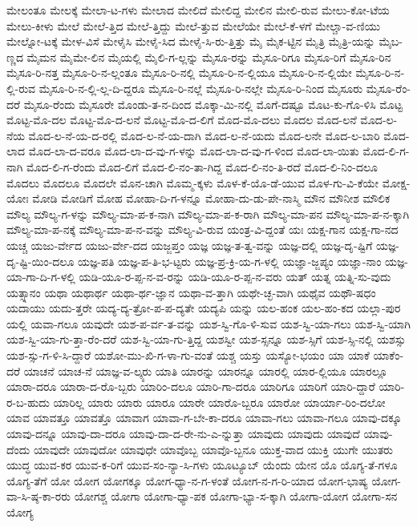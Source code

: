 {ಮೇಲಂತೂ
ಮೇಲಕ್ಕೆ
ಮೇಲಾ-ಟ-ಗಳು
ಮೇಲಾದ
ಮೇಲಿದೆ
ಮೇಲಿದ್ದ
ಮೇಲಿನ
ಮೇಲಿ-ರುವ
ಮೇಲು-ಕೋ-ಟೆಯ
ಮೇಲು-ಕೀಳು
ಮೇಲೆ
ಮೇಲೆ-ತ್ತಿದ
ಮೇಲೆ-ತ್ತಿದ್ದು
ಮೇಲೆ-ತ್ತುವ
ಮೇಲೆಯೇ
ಮೇಲೆ-ಕೆ-ಳಗೆ
ಮೇಲ್ಚಾ-ವ-ಣಿಯು
ಮೇಲ್ನೋ-ಟಕ್ಕೆ
ಮೇಳ-ವಿಸೆ
ಮೇಳೈಸಿ
ಮೇಳೈ-ಸಿದ
ಮೇಳೈ-ಸಿ-ರು-ತ್ತಿತ್ತು
ಮೈ
ಮೈಕ-ಟ್ಟಿನ
ಮೈತ್ರಿ
ಮೈತ್ರಿ-ಯನ್ನು
ಮೈಬ-ಣ್ಣದ
ಮೈಮನ
ಮೈಮೇ-ಲಿನ
ಮೈಯಲ್ಲಿ
ಮೈಲಿ-ಗ-ಲ್ಲನ್ನು
ಮೈಸೂ-ರನ್ನು
ಮೈಸೂ-ರಿಗೂ
ಮೈಸೂ-ರಿಗೆ
ಮೈಸೂ-ರಿನ
ಮೈಸೂ-ರಿ-ನತ್ತ
ಮೈಸೂ-ರಿ-ನ-ಲ್ಲಂತೂ
ಮೈಸೂ-ರಿ-ನಲ್ಲಿ
ಮೈಸೂ-ರಿ-ನ-ಲ್ಲಿಯೂ
ಮೈಸೂ-ರಿ-ನ-ಲ್ಲಿಯೇ
ಮೈಸೂ-ರಿ-ನ-ಲ್ಲಿ-ರುವ
ಮೈಸೂ-ರಿ-ನ-ಲ್ಲಿ-ಲ್ಲ-ದಿ-ದ್ದರೂ
ಮೈಸೂ-ರಿ-ನಲ್ಲೆ
ಮೈಸೂ-ರಿ-ನಲ್ಲೇ
ಮೈಸೂ-ರಿ-ನಿಂದ
ಮೈಸೂರು				
ಮೈಸೂ-ರೆಂ-ದರೆ
ಮೈಸೂ-ರೆಂದು
ಮೈಸೂರೇ
ಮೊಂಡು-ತ-ನ-ದಿಂದ
ಮೊಕ್ಕಾ-ಮಿ-ನಲ್ಲಿ
ಮೊಗೆ-ದಷ್ಟೂ
ಮೊಟ-ಕು-ಗೊ-ಳಿಸಿ
ಮೊಟ್ಟ
ಮೊಟ್ಟ-ಮೊ-ದಲ
ಮೊಟ್ಟ-ಮೊ-ದ-ಲನೆ
ಮೊಟ್ಟ-ಮೊ-ದ-ಲಿಗೆ
ಮೊದ-ಮೊ-ದಲು
ಮೊದಲ
ಮೊದ-ಲನೆ
ಮೊದ-ಲ-ನೆಯ
ಮೊದ-ಲ-ನೆ-ಯ-ದ-ರಲ್ಲಿ
ಮೊದ-ಲ-ನೆ-ಯ-ದಾಗಿ
ಮೊದ-ಲ-ನೆ-ಯದು
ಮೊದ-ಲನೇ
ಮೊದ-ಲ-ಬಾರಿ
ಮೊದ-ಲಾದ
ಮೊದ-ಲಾ-ದ-ವರೂ
ಮೊದ-ಲಾ-ದ-ವು-ಗ-ಳನ್ನು
ಮೊದ-ಲಾ-ದ-ವು-ಗ-ಳಿಂದ
ಮೊದ-ಲಾ-ಯಿತು
ಮೊದ-ಲಿ-ಗ-ನಾಗಿ
ಮೊದ-ಲಿ-ಗ-ರೆಂದು
ಮೊದ-ಲಿಗೆ
ಮೊದ-ಲಿ-ನಂ-ತಾ-ಗಿದ್ದ
ಮೊದ-ಲಿ-ನಂ-ತಿ-ರದೆ
ಮೊದ-ಲಿ-ನಿಂ-ದಲೂ
ಮೊದಲು
ಮೊದಲೂ
ಮೊದಲೇ
ಮೊನ-ಚಾಗಿ
ಮೊಮ್ಮ-ಕ್ಕಳು
ಮೊಳ-ಕೆ-ಯೊ-ಡೆ-ಯುವ
ಮೊಳ-ಗು-ವಿ-ಕೆಯೇ
ಮೋಕ್ಷ-ಯೋಃ
ಮೋಡಿ
ಮೋಡಿಗೆ
ಮೋಹ
ಮೋಹಾ-ದಿ-ಗ-ಳನ್ನೂ
ಮೋಹಾ-ದು-ಡು-ಪೇ-ನಾಸ್ಮಿ
ಮೌನ
ಮೌನೀಶ
ಮೌಲಿಕ
ಮೌಲ್ಯ
ಮೌಲ್ಯ-ಗ-ಳನ್ನು
ಮೌಲ್ಯ-ಮಾ-ಪ-ಕ-ನಾಗಿ
ಮೌಲ್ಯ-ಮಾ-ಪ-ಕ-ರಾಗಿ
ಮೌಲ್ಯ-ಮಾ-ಪನ
ಮೌಲ್ಯ-ಮಾ-ಪ-ನ-ಕ್ಕಾಗಿ
ಮೌಲ್ಯ-ಮಾ-ಪ-ನಕ್ಕೆ
ಮೌಲ್ಯ-ಮಾ-ಪ-ನ-ವನ್ನು
ಮೌಲ್ಯ-ವಿ-ರುವ
ಯಂತ್ರ-ವಿ-ದ್ದಂತೆ
ಯಃ
ಯಕ್ಷ-ಗಾನ
ಯಕ್ಷ-ಗಾ-ನದ
ಯಚ್ಚ
ಯಜು-ರ್ವೇದ
ಯಜು-ರ್ವೇ-ದದ
ಯಜ್ಜಪ್ತಂ
ಯಜ್ಞ
ಯಜ್ಞ-ತ-ತ್ವ-ವನ್ನು
ಯಜ್ಞ-ದಲ್ಲಿ
ಯಜ್ಞ-ದೃ-ಷ್ಟಿಗೆ
ಯಜ್ಞ-ದೃ-ಷ್ಟಿ-ಯಿಂ-ದಲೂ
ಯಜ್ಞ-ಪತಿ
ಯಜ್ಞ-ಪ-ತಿ-ಭ-ಟ್ಟರು
ಯಜ್ಞ-ಪ್ರ-ಕ್ರಿ-ಯ-ಗ-ಳಲ್ಲಿ
ಯಜ್ಞಾ-ಜ್ಜಪ್ಯಂ
ಯಜ್ಞಾ-ನಾಂ
ಯಜ್ಞ-ಯಾ-ಗಾ-ದಿ-ಗ-ಳಲ್ಲಿ
ಯಡಿ-ಯೂ-ರ-ಪ್ಪ-ನ-ವ-ರನ್ನು
ಯಡಿ-ಯೂ-ರ-ಪ್ಪ-ನ-ವರು
ಯತ್
ಯತ್ನ
ಯತ್ನಿ-ಸು-ವುದು
ಯತ್ಸ್ನಾನಂ
ಯಥಾ
ಯಥಾರ್ಥ
ಯಥಾ-ರ್ಥ-ಜ್ಞಾನ
ಯಥಾ-ವ-ತ್ತಾಗಿ
ಯಥೇ-ಚ್ಛ-ವಾಗಿ
ಯಥೈವ
ಯಥೌ-ಷಧಂ
ಯದಾಯು
ಯದು-ತ್ತರೇ
ಯದ್ಯ-ದ್ಯ-ತ್ರೋ-ಪ-ಪ-ದ್ಯತೇ
ಯದ್ಯಪಿ
ಯನ್ನು
ಯಲ-ಹಂಕ
ಯಲ-ಹಂ-ಕದ
ಯಲ್ಲಾ-ಪುರ
ಯಲ್ಲಿ
ಯವಾ-ಗಲೂ
ಯವುದೇ
ಯಶ-ಪ-ರ್ವ-ತ-ವನ್ನು
ಯಶ-ಸ್ವಿ-ಗೊ-ಳಿ-ಸುವ
ಯಶ-ಸ್ವಿ-ಯಾ-ಗಲು
ಯಶ-ಸ್ವಿ-ಯಾಗಿ
ಯಶ-ಸ್ವಿ-ಯಾ-ಗು-ತ್ತಾ-ರೆಂ-ದರೆ
ಯಶ-ಸ್ವಿ-ಯಾ-ಗು-ತ್ತಿದ್ದ
ಯಶಸ್ವೀ
ಯಶ-ಸ್ಸನ್ನೂ
ಯಶ-ಸ್ಸಿಗೆ
ಯಶ-ಸ್ಸಿ-ನಲ್ಲಿ
ಯಶಸ್ಸು
ಯಶ-ಸ್ಸು-ಗ-ಳಿ-ಸಿ-ದ್ದಾರೆ
ಯಶೋ-ಮು-ಖಿ-ಗ-ಳಾ-ಗು-ವಂತೆ
ಯಶ್ಚ
ಯಸ್ತು
ಯಸ್ಯೋ-ಭಯಂ
ಯಾ
ಯಾಕೆ
ಯಾಕೆಂ-ದರೆ
ಯಾಚನೆ
ಯಾಚ-ನೆ
ಯಾಜ್ಞ-ವ-ಲ್ಕ್ಯರು
ಯಾತಿ
ಯಾರನ್ನು
ಯಾರನ್ನೂ
ಯಾರಲ್ಲಿ
ಯಾರ-ಲ್ಲಿಯೂ
ಯಾರಲ್ಲೂ
ಯಾರಾ-ದರೂ
ಯಾರಾ-ದ-ರೊ-ಬ್ಬರು
ಯಾರಿಂ-ದಲೂ
ಯಾರಿ-ಗಾ-ದರೂ
ಯಾರಿಗೂ
ಯಾರಿಗೆ
ಯಾರಿ-ದ್ದಾರೆ
ಯಾರಿ-ರ-ಬ-ಹುದು
ಯಾರಿಲ್ಲ
ಯಾರು
ಯಾರು
ಯಾರೂ
ಯಾರೇ
ಯಾರೊ-ಬ್ಬರೂ
ಯಾರೋ
ಯಾರ್ಯಾ-ರಿಂ-ದಲೋ
ಯಾವ
ಯಾವತ್ತೂ
ಯಾವತ್ತೊ
ಯಾವಾಗ
ಯಾವಾ-ಗ-ಬೇ-ಕಾ-ದರೂ
ಯಾವಾ-ಗಲು
ಯಾವಾ-ಗಲೂ
ಯಾವು-ದಕ್ಕೂ
ಯಾವು-ದನ್ನೂ
ಯಾವು-ದಾ-ದರೂ
ಯಾವು-ದಾ-ದ-ರೇ-ನು-ಎ-ನ್ನುತ್ತಾ
ಯಾವುದು
ಯಾವುದು
ಯಾವುದೆ
ಯಾವು-ದೆಂದು
ಯಾವುದೇ
ಯಾವುದೋ
ಯಾವುಧೇ
ಯಾವೊಬ್ಬ
ಯಾವೊ-ಬ್ಬನೂ
ಯುಕ್ತ-ವಾದ
ಯುಕ್ತಿ
ಯುಗೇ
ಯುತರು
ಯುದ್ಧ
ಯುವ-ಕರ
ಯುವ-ಕ-ರಿಗೆ
ಯುವ-ಸಂ-ನ್ಯಾ-ಸಿ-ಗಳು
ಯೂಟ್ಯೂಬ್
ಯೆಂದು
ಯೇನ
ಯೊ
ಯೊಗ್ಯ-ತೆ-ಗಳೂ
ಯೊಗ್ಯ-ತೆಗೆ
ಯೋ
ಯೋಗ
ಯೋಗಕ್ಕೂ
ಯೋಗ-ಧ್ಯಾ-ನ-ಗ-ಳಂತೆ
ಯೋಗ-ನ-ಗ-ರಿ-ಯಾದ
ಯೋಗ-ಭಾಷ್ಯ
ಯೋಗ-ವಾ-ಸಿ-ಷ್ಠ-ಕಾ-ರರು
ಯೋಗಶ್ಚ
ಯೋಗಾ
ಯೋಗಾ-ಧ್ಯಾ-ಪಕ
ಯೋಗಾ-ಭ್ಯಾ-ಸ-ಕ್ಕಾಗಿ
ಯೋಗಾ-ಯೋಗ
ಯೋಗಾ-ಸನ
ಯೋಗ್ಯ
}
